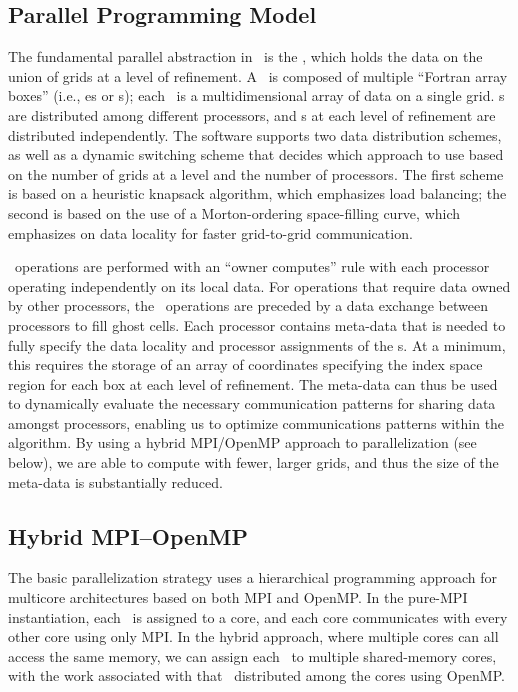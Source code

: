 \subsection{Parallel Programming Model}

The fundamental parallel abstraction in \BoxLib\ is the \MultiFab, which holds the data on the 
union of grids at a level of refinement.  A \MultiFab\ is composed of multiple ``Fortran array boxes''
(i.e., \FArrayBox es or \Fab s); each \Fab\ is a multidimensional array of data on a single grid. 
\Fab s are distributed among different processors, and
\Fab s at each level of refinement are distributed 
independently.  The software supports two data distribution schemes, as well as a 
dynamic switching scheme that decides which approach to use based on the number of 
grids at a level and the number of processors.  The first scheme is based on a 
heuristic knapsack algorithm, which emphasizes load balancing; the second is based on 
the use of a Morton-ordering space-filling curve, which emphasizes on data locality for
faster grid-to-grid communication.

\MultiFab\ operations are performed with an ``owner computes'' rule 
with each processor operating independently on its local data.  For operations that 
require data owned by other processors, the \MultiFab\ operations are preceded by a 
data exchange between processors to fill ghost cells.  Each processor contains 
meta-data that is needed 
to fully specify the data locality and processor assignments of the \Fab s. At a 
minimum, this requires the storage of an array of coordinates specifying the index space 
region for each box at each level of refinement.  The meta-data can thus be used to 
dynamically evaluate the necessary communication patterns for sharing data amongst 
processors, enabling us to optimize communications patterns within the algorithm.
By using a hybrid MPI/OpenMP approach to parallelization (see below), we are able to 
compute with fewer, larger grids, and thus the size of the meta-data is substantially 
reduced.

\subsection{Hybrid MPI--OpenMP}

The basic parallelization strategy uses a hierarchical programming approach for 
multicore architectures based on both MPI and OpenMP.  In the pure-MPI instantiation, 
each \Fab\ is assigned to a core, and each core communicates 
with every other core using only MPI.  In the hybrid approach, where multiple cores
can all access the same memory, we can assign each \Fab\ to multiple shared-memory cores,
with the work associated with that \Fab\ distributed among the cores using OpenMP.


